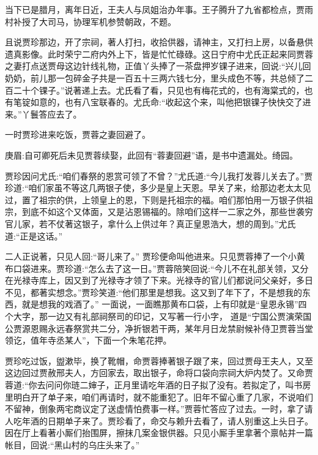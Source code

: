 \begin{parag}
    当下已是腊月，离年日近，王夫人与凤姐治办年事。王子腾升了九省都检点，贾雨村补授了大司马，协理军机参赞朝政，不题。
\end{parag}


\begin{parag}
    且说贾珍那边，开了宗祠，著人打扫，收拾供器，请神主，又打扫上房，以备悬供遗真影像。此时荣宁二府内外上下，皆是忙忙碌碌。这日宁府中尤氏正起来同贾蓉之妻打点送贾母这边针线礼物，正值丫头捧了一茶盘押岁锞子进来，回说:“兴儿回奶奶，前儿那一包碎金子共是一百五十三两六钱七分，里头成色不等，共总倾了二百二十个锞子。”说著递上去。尤氏看了看，只见也有梅花式的，也有海棠式的，也有笔锭如意的，也有八宝联春的。尤氏命:“收起这个来，叫他把银锞子快快交了进来。”丫鬟答应去了。
\end{parag}


\begin{parag}
    一时贾珍进来吃饭，贾蓉之妻回避了。\begin{note}庚眉:自可卿死后未见贾蓉续娶，此回有“蓉妻回避”语，是书中遗漏处。绮园。\end{note}贾珍因问尤氏:“咱们春祭的恩赏可领了不曾？”尤氏道:“今儿我打发蓉儿关去了。”贾珍道:“咱们家虽不等这几两银子使，多少是皇上天恩。早关了来，给那边老太太见过，置了祖宗的供，上领皇上的恩，下则是托祖宗的福。咱们那怕用一万银子供祖宗，到底不如这个又体面，又是沾恩锡福的。除咱们这样一二家之外，那些世袭穷官儿家，若不仗著这银子，拿什么上供过年？真正皇恩浩大，想的周到。”尤氏道:“正是这话。”
\end{parag}


\begin{parag}
    二人正说著，只见人回:“哥儿来了。” 贾珍便命叫他进来。只见贾蓉捧了一个小黄布口袋进来。贾珍道:“怎么去了这一日。”贾蓉陪笑回说:“今儿不在礼部关领，又分在光禄寺库上，因又到了光禄寺才领了下来。光禄寺的官儿们都说问父亲好，多日不见，都著实想念。”贾珍笑道:“他们那里是想我。这又到了年下了，不是想我的东西，就是想我的戏酒了。” 一面说，一面瞧那黄布口袋，上有印就是“皇恩永锡”四个大字，那一边又有礼部祠祭司的印记，又写著一行小字，
    道是“宁国公贾演荣国公贾源恩赐永远春祭赏共二分，净折银若干两，某年月日龙禁尉候补侍卫贾蓉当堂领讫，值年寺丞某人”，下面一个朱笔花押。
\end{parag}


\begin{parag}
    贾珍吃过饭，盥漱毕，换了靴帽，命贾蓉捧著银子跟了来，回过贾母王夫人，又至这边回过贾赦邢夫人，方回家去，取出银子，命将口袋向宗祠大炉内焚了。又命贾蓉道:“你去问问你琏二婶子，正月里请吃年酒的日子拟了没有。若拟定了，叫书房里明白开了单子来，咱们再请时，就不能重犯了。旧年不留心重了几家，不说咱们不留神，倒象两宅商议定了送虚情怕费事一样。”贾蓉忙答应了过去。一时，拿了请人吃年酒的日期单子来了。贾珍看了，命交与赖升去看了，请人别重这上头日子。因在厅上看著小厮们抬围屏，擦抹几案金银供器。只见小厮手里拿著个禀帖并一篇帐目，回说:“黑山村的乌庄头来了。”
\end{parag}


